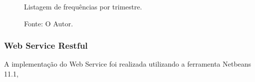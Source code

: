 \begin{figure}[H]
    \caption{Listagem de frequências por trimestre.}
	\centering %
	\label{figura:login}
	\caption*{Fonte: O Autor.}
\end{figure}

\subsubsection{Web Service Restful}

A implementação do Web Service foi realizada utilizando a ferramenta Netbeans 11.1,


